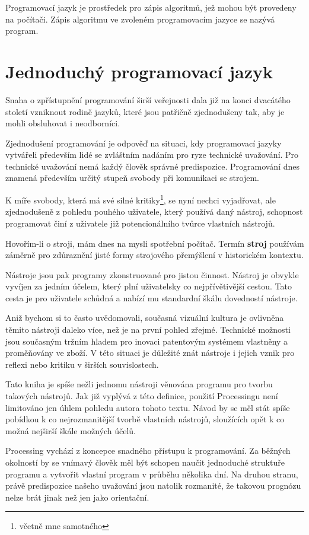 \documentclass[10pt]{book}
\newcommand{\oddil}[1]{\section{#1}\index{#1}\label{#1}}
\newcommand{\slovnik}[1]{\textbf{\gls{#1}}\index{#1}\label{#1}}
\begin{document}
Programovací jazyk je prostředek pro zápis algoritmů, jež mohou být provedeny na počítači. Zápis algoritmu ve zvoleném programovacím jazyce se nazývá program.





\oddil{Jednoduchý programovací jazyk}

Snaha o zpřístupnění programování širší veřejnosti dala již na konci dvacátého století vzniknout rodině jazyků, které jsou patřičně zjednodušeny tak, aby je mohli obsluhovat i neodborníci.

Zjednodušení programování je odpověď na situaci, kdy programovací jazyky vytvářeli především lidé se zvláštním nadáním pro ryze technické uvažování. Pro technické uvažování nemá každý člověk správné predispozice. Programování dnes znamená především určitý stupeň svobody při komunikaci se strojem.

K míře svobody, která má své silné kritiky\footnote{včetně mne samotného}, se nyní nechci vyjadřovat, ale zjednodušeně z pohledu pouhého uživatele, který používá daný nástroj, schopnost programovat činí z uživatele již potencionálního tvůrce vlastních nástrojů.

Hovořím-li o stroji, mám dnes na mysli spotřební počítač. Termín \slovnik{stroj} používám záměrně pro zdůraznění jisté formy strojového přemýšlení v historickém kontextu.

Nástroje jsou pak programy zkonstruované pro jistou činnost. Nástroj je obvykle vyvíjen za jedním účelem, který plní uživatelsky co nejpřívětivější cestou. Tato cesta je pro uživatele schůdná a nabízí mu standardní škálu dovedností nástroje.

Aniž bychom si to často uvědomovali, současná vizuální kultura je ovlivněna těmito nástroji daleko více, než je na první pohled zřejmé. Technické možnosti jsou současným tržním hladem pro inovaci patentovým systémem vlastněny a proměňovány ve zboží. V této situaci je důležité znát nástroje i jejich vznik pro reflexi nebo kritiku v širších souvislostech.

Tato kniha je spíše nežli jednomu nástroji věnována programu pro tvorbu takových nástrojů. Jak již vyplývá z této definice, použití Processingu není limitováno jen úhlem pohledu autora tohoto textu. Návod by se měl stát spíše pobídkou k co nejrozmanitější tvorbě vlastních nástrojů, sloužících opět k co možná nejširší škále možných účelů.

Processing vychází z koncepce snadného přístupu k programování. Za běžných okolností by se vnímavý člověk měl být schopen naučit jednoduché struktuře programu a vytvořit vlastní program v průběhu několika dní. Na druhou stranu, právě predispozice našeho uvažování jsou natolik rozmanité, že takovou prognózu nelze brát jinak než jen jako orientační.
\end{document}
